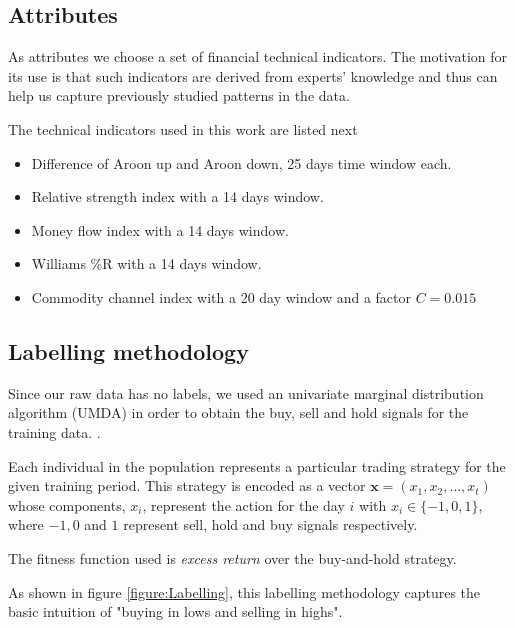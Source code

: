 \documentclass[preprint,3p,twocolumn]{elsarticle}
\begin{document}
\subsection{Attributes}
\label{subsec:attributes}
As attributes we choose a set of financial technical indicators. The motivation for its use is that such indicators are derived from experts' knowledge and thus can help us capture previously studied patterns in the data.

The technical indicators used in this work are listed next

\begin{itemize}
\item Difference of Aroon up and Aroon down, 25 days time window each.

\item Relative strength index with a 14 days window.

\item Money flow index with a 14 days window.

\item Williams \%R with a 14 days window.

\item Commodity channel index with a 20 day window and a factor $C = 0.015$
\end{itemize}

\subsection{Labelling methodology}
\label{subsec:labelling}
Since our raw data has no labels, we used an univariate marginal distribution algorithm (UMDA) in order to obtain the buy, sell and hold signals for the training data. \cite{simon2013evolutionary}.

Each individual in the population represents a particular trading strategy for the given training period. This strategy is encoded as a vector $\mathbf{x} = \left(x_1, x_2, \ldots, x_t \right)$ whose components, $x_{i}$, represent the action for the day $i$ with $ x_{i} \in \{-1,0,1 \}$, where $-1,0$ and $1$ represent sell, hold and buy signals respectively. 

The fitness function used is \textit{excess return} over the buy-and-hold strategy.

As shown in figure \ref{figure:Labelling}, this labelling methodology captures the basic intuition of "buying in lows and selling in highs".
\end{document}
